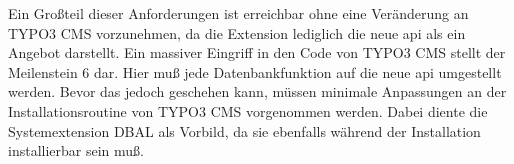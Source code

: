 Ein Großteil dieser Anforderungen ist erreichbar ohne eine Veränderung an TYPO3 CMS vorzunehmen, da die Extension lediglich die neue \gls{api} als ein Angebot darstellt. Ein massiver Eingriff in den Code von TYPO3 CMS stellt der Meilenstein 6 dar. Hier muß jede Datenbankfunktion auf die neue \gls{api} umgestellt werden. Bevor das jedoch geschehen kann, müssen minimale Anpassungen an der Installationsroutine von TYPO3 CMS vorgenommen werden. Dabei diente die Systemextension DBAL als Vorbild, da sie ebenfalls während der Installation installierbar sein muß.
